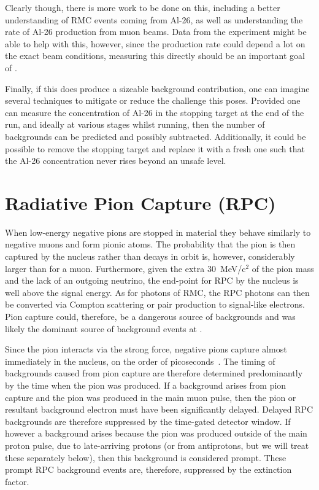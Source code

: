 Clearly though, there is more work to be done on this, including a better understanding of \ac{RMC} events coming from Al-26, as well as understanding the rate of Al-26 production from muon beams.
Data from the \alcap experiment might be able to help with this, however, since the production rate could depend a lot on the exact beam conditions, measuring this directly should be an important goal of \phaseI.

Finally, if this does produce a sizeable background contribution, one can imagine several techniques to mitigate or reduce the challenge this poses.
Provided one can measure the concentration of Al-26 in the stopping target at the end of the run, and ideally at various stages whilst running, then the number of backgrounds can be predicted and possibly subtracted.
Additionally, it could be possible to remove the stopping target and replace it with a fresh one such that the Al-26 concentration never rises beyond an unsafe level.


\section{Radiative Pion Capture (\acs{RPC})}
When low-energy negative pions are stopped in material they behave similarly to negative muons and form pionic atoms.
The probability that the pion is then captured by the nucleus rather than decays in orbit is, however, considerably larger than for a muon.
Furthermore, given the extra 30~MeV/c$^2$ of the pion mass and the lack of an outgoing neutrino, the end-point for \acf{RPC} by the nucleus is well above the \mueconv signal energy.
As for photons of \ac{RMC}, the \ac{RPC} photons can then be converted via Compton scattering or pair production to signal-like electrons.
Pion capture could, therefore, be a dangerous source of backgrounds and was likely the dominant source of background events at \sindrumII.

Since the pion interacts via the strong force, negative pions capture almost immediately in the nucleus, on the order of picoseconds~\cite{Engelhardt:1975ct}.
The timing of backgrounds caused from pion capture are therefore determined predominantly by the time when the pion was produced.
If a background arises from pion capture and the pion was produced in the main muon pulse, then the pion or resultant background electron must have been significantly delayed.
Delayed \ac{RPC} backgrounds are therefore suppressed by the time-gated detector window.
If however a background arises because the pion was produced outside of the main proton pulse, due to late-arriving protons (or from antiprotons, but we will treat these separately below), then this background is considered prompt.
These prompt \ac{RPC} background events are, therefore, suppressed by the extinction factor.

